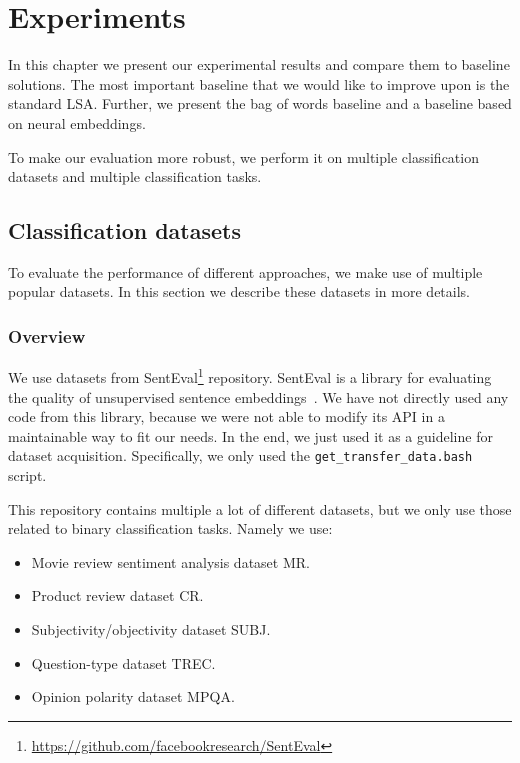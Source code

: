 \chapter{Experiments}

In this chapter we present our experimental results and compare them to baseline solutions.
The most important baseline that we would like to improve upon is the standard LSA.
Further, we present the bag of words baseline and a baseline based on neural embeddings.

To make our evaluation more robust, we perform it on multiple classification datasets and multiple classification tasks.

\section{Classification datasets}
    
    To evaluate the performance of different approaches, we make use of multiple popular datasets.
    In this section we describe these datasets in more details.
    
    \subsection{Overview} \label{sec:data:overview}
    
    We use datasets from  SentEval\footnote{\url{https://github.com/facebookresearch/SentEval}} repository.
    SentEval is a library for evaluating the quality of unsupervised sentence embeddings~\cite{conneau2017supervised}.
    We have not directly used  any code from this library, because we were not able to modify its API in a maintainable way to fit our needs. 
    In the end, we just used it as a guideline for dataset acquisition.
    Specifically, we only used the \texttt{get\_transfer\_data.bash} script.
    
    This repository contains multiple a lot of different datasets, 
    but we only use those related to binary classification tasks.
    Namely we use:
    \begin{itemize}
        \item Movie review sentiment analysis dataset MR.
        \item Product review dataset CR.
        \item Subjectivity/objectivity dataset SUBJ.
        \item Question-type dataset TREC.
        \item Opinion polarity dataset MPQA.
    \end{itemize}
    
